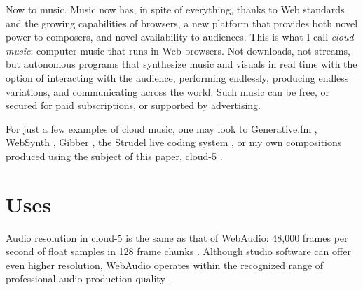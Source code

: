 \documentclass[runningheads,a4paper]{llncs}
\begin{document}
Now to music. Music now has, in spite of everything, thanks to Web standards and the growing capabilities of browsers, a new platform that provides both novel power to composers, and novel availability to audiences. This is what I call \emph{cloud music}: computer music that runs in Web browsers. Not downloads, not streams, but autonomous programs that synthesize music and visuals in real time with the option of interacting with the audience, performing endlessly, producing endless variations, and communicating across the world. Such music can be free, or secured for paid subscriptions, or supported by advertising. 

For just a few examples of cloud music, one may look to Generative.fm \cite{alexbainter}, WebSynth \cite{websynth}, Gibber \cite{gibber}, the Strudel live coding system \cite{strudel}, or my own compositions produced using the subject of this paper, cloud-5 \cite{cloud5}.

\section{Uses}

Audio resolution in cloud-5 is the same as that of WebAudio: 48,000 frames per second of float samples in 128 frame chunks \cite{webaudiostandard}. Although studio software can offer even higher resolution, WebAudio operates within the recognized range of professional audio production quality \cite{katz} \cite{bassal}.
\end{document}
